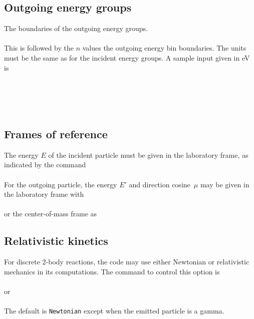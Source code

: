 \subsection{Outgoing energy groups}\label{Eout-bins}
The boundaries of the outgoing energy groups.\\
  \\
This is followed by the $n$ values the outgoing energy bin
boundaries.  The units must be the same as for the incident
energy groups.  A sample input given in eV is\\
  \\
  \\ 
  \\
   \Input{ \indent $\cdots$}{}\\

\subsection{Frames of reference}\label{Reference-frame}
The energy $E$ of the incident particle must be given in the laboratory frame,
as indicated by the command\\
  \\
For the outgoing particle, the energy $E'$ and direction cosine~$\mu$
may be given in the laboratory frame with\\
  \\
or the center-of-mass frame as\\

\subsection{Relativistic kinetics}\label{Sec:relativistic}
For discrete 2-body reactions, 
the code may use either Newtonian or relativistic mechanics in its
computations.  The command to control this option is\\
  \\
or\\
  \\
The default is \texttt{Newtonian} except when the emitted particle is a gamma.

